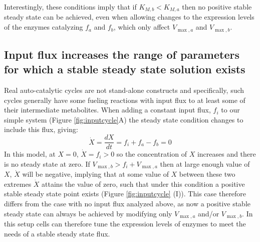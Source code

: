 \documentclass[a4page,notitlepage]{article}
\begin{document}
    Interestingly, these conditions imply that if $K_{M,b}<K_{M,a}$ then no positive stable steady state can be achieved, even when allowing changes to the expression levels of the enzymes catalyzing $f_a$ and $f_b$, which only affect $V_{\max,a}$ and $V_{\max,b}$.
    
\subsection{Input flux increases the range of parameters for which a stable steady state solution exists}
    Real auto-catalytic cycles are not stand-alone constructs and specifically, such cycles generally have some fueling reactions with input flux to at least some of their intermediate metabolites.
    When adding a constant input flux, $f_i$ to our simple system (Figure \ref{fig:inputcycle}A) the steady state condition changes to include this flux, giving:
    \begin{equation*}
      \dot X = \frac{dX}{dt} = f_i + f_a - f_b = 0
    \end{equation*}
    In this model, at $X=0$, $\dot X=f_i>0$ so the concentration of $X$ increases and there is no steady state at zero.
    If $V_{\max,b}>f_i+V_{\max,a}$ then at large enough value of $X$, $\dot X$ will be negative, implying that at some value of $X$ between these two extremes $\dot{X}$ attains the value of zero, such that under this condition a positive stable steady state point exists (Figure \ref{fig:inputcycle} (I)).
    This case therefore differs from the case with no input flux analyzed above, as now a positive stable steady state can always be achieved by modifying only $V_{\max,a}$ and/or $V_{\max,b}$.
    In this setup cells can therefore tune the expression levels of enzymes to meet the needs of a stable steady state flux.
\end{document}
